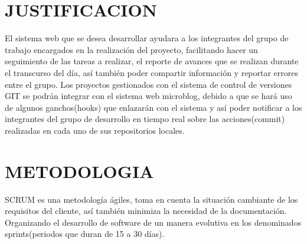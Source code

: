 \section{JUSTIFICACION}
El sistema web que se desea desarrollar ayudara  a los integrantes del grupo de trabajo encargados en la realización del proyecto, facilitando hacer un seguimiento de las tareas a realizar, el reporte de avances que se realizan durante el transcurso del día, así también poder compartir información y reportar errores entre el grupo.
Los proyectos gestionados con el sistema de control de versiones GIT se podrán integrar con el sistema web microblog, debido a que se hará uso de algunos ganchos(hooks) que enlazarán con el sistema y así poder notificar a los integrantes del grupo de desarrollo en tiempo real sobre las acciones(commit) realizadas en cada uno de sus repositorios locales.
\section{METODOLOGIA}
SCRUM es una metodología ágiles, toma en cuenta la situación cambiante de los requisitos del cliente, así también minimiza la necesidad de la documentación.
Organizando el desarrollo de software de un manera evolutiva en los denominados sprints(periodos que duran de 15 a 30 días).


%
